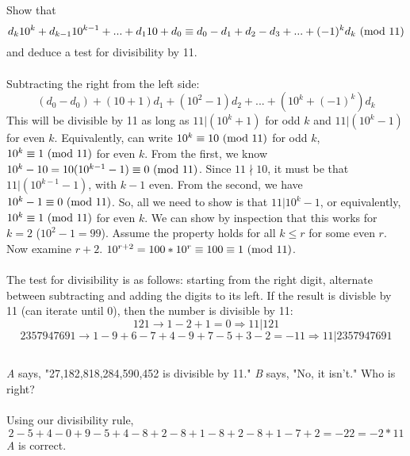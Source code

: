 \documentclass{article}
\begin{document}
\subsection{}
Show that
\begin{equation*}
    d_k10^k + d_{k-1}10^{k-1} + ... + d_110 + d_0
    \equiv d_0 - d_1 + d_2 - d_3 + ... + (-1)^kd_k \ (\mathrm{mod}\ 11)
\end{equation*}
and deduce a test for divisibility by 11.\\~\\
Subtracting the right from the left side:
\begin{equation*}
    (d_0 - d_0) + (10 + 1)d_1 + (10^2 - 1)d_2 + ... + (10^k + (-1)^k)d_k
\end{equation*}
This will be divisible by 11 as long as $11|(10^k + 1)$ for odd $k$
and $11|(10^k - 1)$ for even $k$.
Equivalently, can write $10^k \equiv 10 \ (\mathrm{mod}\ 11)$ for odd $k$,
$10^k \equiv 1 \ (\mathrm{mod}\ 11)$ for even $k$.
From the first, we know $10^k - 10 = 10(10^{k - 1} - 1) \equiv 0 \ (\mathrm{mod}\ 11)$.
Since $11 \nmid 10$, it must be that $11|(10^{k - 1} - 1)$, with $k - 1$ even.
From the second, we have $10^k - 1 \equiv 0 \ (\mathrm{mod}\ 11)$.
So, all we need to show is that $11|10^k - 1$,
or equivalently, $10^k \equiv 1 \ (\mathrm{mod}\ 11)$ for even $k$.
We can show by inspection that this works for $k = 2$ ($10^2 - 1 = 99$).
Assume the property holds for all $k \leq r$ for some even $r$.
Now examine $r + 2$.
$10^{r + 2} = 100*10^r \equiv 100 \equiv 1 \ (\mathrm{mod}\ 11)$.\\~\\
The test for divisibility is as follows:
starting from the right digit, alternate between subtracting and adding the
digits to its left.
If the result is divisble by 11 (can iterate until 0), then the number is divisible by 11:
\begin{equation*}
    121 \longrightarrow 1 - 2 + 1 = 0 \Rightarrow 11|121
\end{equation*}
\begin{equation*}
    2357947691 \longrightarrow
    1 - 9 + 6 - 7 + 4 - 9 + 7 - 5 + 3 - 2 = -11 \Rightarrow 11|2357947691
\end{equation*}

\subsection{}
\textit{A} says, "27,182,818,284,590,452 is divisible by 11."
\textit{B} says, "No, it isn't." Who is right?\\~\\
Using our divisibility rule,
\begin{equation*}
    2 - 5 + 4 - 0 + 9 - 5 + 4 - 8 + 2 - 8 + 1 - 8 + 2 - 8 + 1 - 7 + 2 = -22 = -2 * 11
\end{equation*}
\textit{A} is correct.
\end{document}
